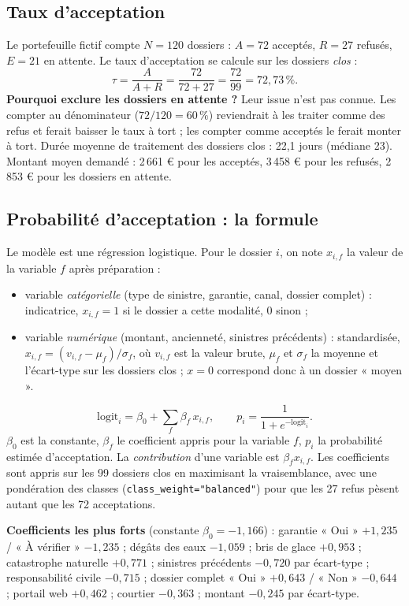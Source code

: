 \documentclass[11pt,a4paper]{article}
\begin{document}
\subsection{Taux d'acceptation}
Le portefeuille fictif compte $N=120$ dossiers : $A=72$ acceptés, $R=27$ refusés, $E=21$ en
attente. Le taux d'acceptation se calcule sur les dossiers \emph{clos} :
\[
\tau = \frac{A}{A+R} = \frac{72}{72+27} = \frac{72}{99} = 72{,}73\,\% .
\]
\textbf{Pourquoi exclure les dossiers en attente ?} Leur issue n'est pas connue. Les compter au
dénominateur ($72/120 = 60\,\%$) reviendrait à les traiter comme des refus et ferait baisser le
taux à tort ; les compter comme acceptés le ferait monter à tort. Durée moyenne de traitement des
dossiers clos : 22,1 jours (médiane 23). Montant moyen demandé : 2\,661 € pour les acceptés,
3\,458 € pour les refusés, 2\,853 € pour les dossiers en attente.

\subsection{Probabilité d'acceptation : la formule}
Le modèle est une régression logistique. Pour le dossier $i$, on note $x_{i,f}$ la valeur de la
variable $f$ après préparation :
\begin{itemize}
\item variable \emph{catégorielle} (type de sinistre, garantie, canal, dossier complet) :
indicatrice, $x_{i,f}=1$ si le dossier a cette modalité, 0 sinon ;
\item variable \emph{numérique} (montant, ancienneté, sinistres précédents) : standardisée,
$x_{i,f} = (v_{i,f}-\mu_f)/\sigma_f$, où $v_{i,f}$ est la valeur brute, $\mu_f$ et $\sigma_f$ la
moyenne et l'écart-type sur les dossiers clos ; $x=0$ correspond donc à un dossier « moyen ».
\end{itemize}
\[
\text{logit}_i = \beta_0 + \sum_f \beta_f\,x_{i,f},
\qquad
p_i = \frac{1}{1+e^{-\text{logit}_i}} .
\]
$\beta_0$ est la constante, $\beta_f$ le coefficient appris pour la variable $f$, $p_i$ la
probabilité estimée d'acceptation. La \emph{contribution} d'une variable est $\beta_f x_{i,f}$.
Les coefficients sont appris sur les 99 dossiers clos en maximisant la vraisemblance, avec une
pondération des classes (\texttt{class\_weight="balanced"}) pour que les 27 refus pèsent autant
que les 72 acceptations.

\textbf{Coefficients les plus forts} (constante $\beta_0=-1{,}166$) :
garantie « Oui » $+1{,}235$ / « À vérifier » $-1{,}235$ ; dégâts des eaux $-1{,}059$ ;
bris de glace $+0{,}953$ ; catastrophe naturelle $+0{,}771$ ; sinistres précédents $-0{,}720$
par écart-type ; responsabilité civile $-0{,}715$ ; dossier complet « Oui » $+0{,}643$ / « Non »
$-0{,}644$ ; portail web $+0{,}462$ ; courtier $-0{,}363$ ; montant $-0{,}245$ par écart-type.
\end{document}
